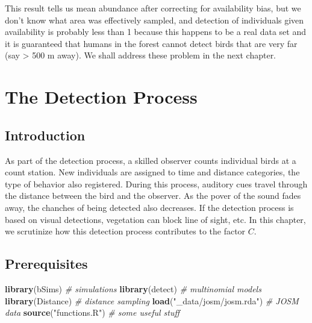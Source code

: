 \documentclass[12pt,]{book}
\newenvironment{Shaded}{\begin{snugshade}}{\end{snugshade}}
\newcommand{\CommentTok}[1]{\textcolor[rgb]{0.56,0.35,0.01}{\textit{#1}}}
\newcommand{\KeywordTok}[1]{\textcolor[rgb]{0.13,0.29,0.53}{\textbf{#1}}}
\newcommand{\NormalTok}[1]{#1}
\newcommand{\StringTok}[1]{\textcolor[rgb]{0.31,0.60,0.02}{#1}}
\begin{document}
This result tells us mean abundance after correcting for availability
bias, but we don't know what area was effectively sampled,
and detection of individuals given availability is probably less than 1
because this happens to be a real data set and it is guaranteed that
humans in the forest cannot detect birds that are very far (say \textgreater{} 500 m away).
We shall address these problem in the next chapter.

\hypertarget{detection}{%
\chapter{The Detection Process}\label{detection}}

\hypertarget{introduction-3}{%
\section{Introduction}\label{introduction-3}}

As part of the detection process, a skilled observer
counts individual birds at a count station.
New individuals are assigned to time and distance categories,
the type of behavior also registered.
During this process, auditory cues travel through
the distance between the bird and the observer.
As the pover of the sound fades away, the
chanches of being detected also decreases.
If the detection process is based on visual detections,
vegetation can block line of sight, etc.
In this chapter, we scrutinize how this detection process
contributes to the factor \(C\).

\hypertarget{prerequisites-3}{%
\section{Prerequisites}\label{prerequisites-3}}

\begin{Shaded}
\begin{Highlighting}[]
\KeywordTok{library}\NormalTok{(bSims)                }\CommentTok{# simulations}
\KeywordTok{library}\NormalTok{(detect)               }\CommentTok{# multinomial models}
\KeywordTok{library}\NormalTok{(Distance)             }\CommentTok{# distance sampling}
\KeywordTok{load}\NormalTok{(}\StringTok{"_data/josm/josm.rda"}\NormalTok{)   }\CommentTok{# JOSM data}
\KeywordTok{source}\NormalTok{(}\StringTok{"functions.R"}\NormalTok{)         }\CommentTok{# some useful stuff}
\end{Highlighting}
\end{Shaded}
\end{document}
